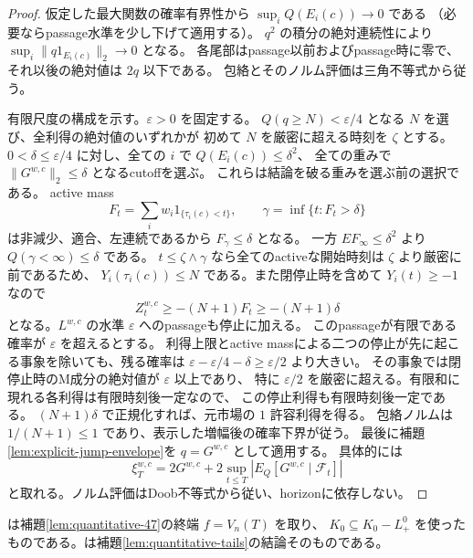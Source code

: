 \begin{proof}
仮定した最大関数の確率有界性から $\sup_iQ(E_i(c))\to0$ である
（必要ならpassage水準を少し下げて適用する）。
$q^2$ の積分の絶対連続性により $\sup_i\|q1_{E_i(c)}\|_2\to0$ となる。
各尾部はpassage以前およびpassage時に零で、それ以後の絶対値は $2q$ 以下である。
包絡とそのノルム評価は三角不等式から従う。

有限尺度の構成を示す。$\varepsilon>0$ を固定する。
$Q(q\geq N)<\varepsilon/4$ となる $N$ を選び、全利得の絶対値のいずれかが
初めて $N$ を厳密に超える時刻を $\zeta$ とする。
$0<\delta\leq\varepsilon/4$ に対し、全ての $i$ で $Q(E_i(c))\leq\delta^2$、
全ての重みで $\|G^{w,c}\|_2\leq\delta$ となるcutoffを選ぶ。
これらは結論を破る重みを選ぶ前の選択である。
active mass
\[
 F_t=\sum_iw_i1_{\{\tau_i(c)<t\}},\qquad
 \gamma=\inf\{t:F_t>\delta\}
\]
は非減少、適合、左連続であるから $F_\gamma\leq\delta$ となる。
一方 $EF_\infty\leq\delta^2$ より $Q(\gamma<\infty)\leq\delta$ である。
$t\leq\zeta\wedge\gamma$ なら全てのactiveな開始時刻は $\zeta$ より厳密に前であるため、
$Y_i(\tau_i(c))\leq N$ である。また閉停止時を含めて $Y_i(t)\geq-1$ なので
\[
 Z^{w,c}_t\geq-(N+1)F_t\geq-(N+1)\delta
\]
となる。$L^{w,c}$ の水準 $\varepsilon$ へのpassageも停止に加える。
このpassageが有限である確率が $\varepsilon$ を超えるとする。
利得上限とactive massによる二つの停止が先に起こる事象を除いても、残る確率は
$\varepsilon-\varepsilon/4-\delta\geq\varepsilon/2$ より大きい。
その事象では閉停止時のM成分の絶対値が $\varepsilon$ 以上であり、
特に $\varepsilon/2$ を厳密に超える。有限和に現れる各利得は有限時刻後一定なので、
この停止利得も有限時刻後一定である。
$(N+1)\delta$ で正規化すれば、元市場の $1$ 許容利得を得る。
包絡ノルムは $1/(N+1)\leq1$ であり、表示した増幅後の確率下界が従う。
最後に補題\ref{lem:explicit-jump-envelope}を $q=G^{w,c}$ として適用する。
具体的には
\[
 \xi_T^{w,c}=2G^{w,c}+2\sup_{t\leq T}|E_Q[G^{w,c}\mid\mathcal F_t]|
\]
と取れる。ノルム評価はDoob不等式から従い、horizonに依存しない。
\end{proof}

は補題\ref{lem:quantitative-47}の終端 $f=V_n(T)$ を取り、
$K_0\subseteq K_0-L^0_+$ を使ったものである。は補題\ref{lem:quantitative-tails}の結論そのものである。
